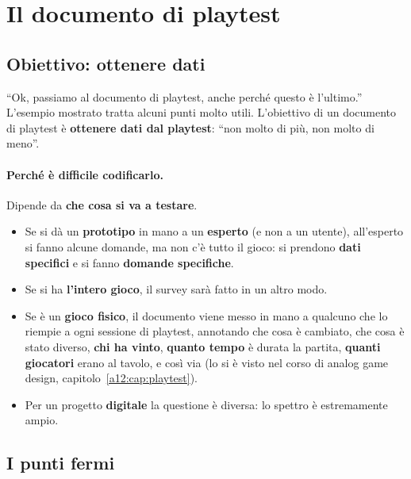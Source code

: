 \section{Il documento di playtest}
\label{gd10:sec:playtest-doc}



\subsection{Obiettivo: ottenere dati}

``Ok, passiamo al documento di playtest, anche perché questo è l'ultimo.''
L'esempio mostrato tratta alcuni punti molto utili. L'obiettivo di un
documento di playtest è \textbf{ottenere dati dal playtest}: ``non molto di
più, non molto di meno''.

\paragraph{Perché è difficile codificarlo.} Dipende da \textbf{che cosa si
va a testare}.
\begin{itemize}
  \item Se si dà un \textbf{prototipo} in mano a un \textbf{esperto} (e non
        a un utente), all'esperto si fanno alcune domande, ma non c'è tutto
        il gioco: si prendono \textbf{dati specifici} e si fanno
        \textbf{domande specifiche}.
  \item Se si ha \textbf{l'intero gioco}, il survey sarà fatto in un altro
        modo.
  \item Se è un \textbf{gioco fisico}, il documento viene messo in mano a
        qualcuno che lo riempie a ogni sessione di playtest, annotando che
        cosa è cambiato, che cosa è stato diverso, \textbf{chi ha vinto},
        \textbf{quanto tempo} è durata la partita, \textbf{quanti giocatori}
        erano al tavolo, e così via (lo si è visto nel corso di analog game
        design, capitolo~\ref{a12:cap:playtest}).
  \item Per un progetto \textbf{digitale} la questione è diversa: lo
        spettro è estremamente ampio.
\end{itemize}

\subsection{I punti fermi}

